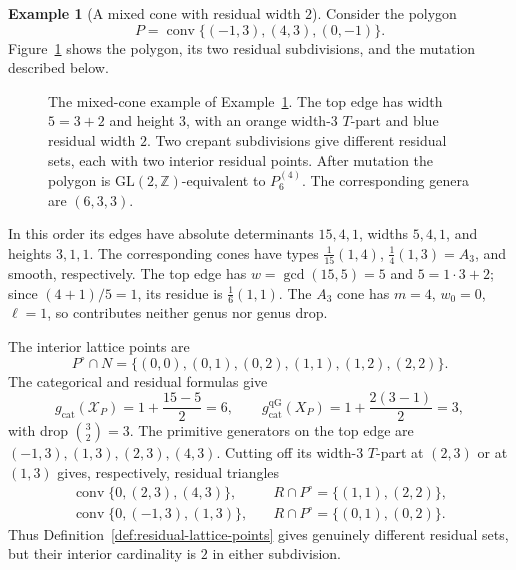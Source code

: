 \documentclass[11pt]{article}
\theoremstyle{plain}
\theoremstyle{definition}
\newtheorem{example}[theorem]{Example}
\theoremstyle{remark}
\newcommand{\Z}{\mathbb Z}
\newcommand{\1}{\mathbf 1}
\begin{document}
\begin{example}[A mixed cone with residual width $2$]\label{ex:mixed-cone-delta}
Consider the polygon
\[
\boxed{P=\operatorname{conv}\{(-1,3),(4,3),(0,-1)\}.}
\]
Figure~\ref{fig:mixed-cone-example} shows the polygon, its two residual subdivisions, and the mutation described below.

\begin{figure}[tp]
\centering

\caption{The mixed-cone example of Example~\ref{ex:mixed-cone-delta}.  The top edge has width $5=3+2$ and height $3$, with an orange width-$3$ $T$-part and blue residual width $2$.  Two crepant subdivisions give different residual sets, each with two interior residual points.  After mutation the polygon is $\mathrm{GL}(2,\Z)$-equivalent to $P_6^{(4)}$.  The corresponding genera are $(6,3,3)$.}
\label{fig:mixed-cone-example}
\end{figure}

In this order its edges have absolute determinants $15,4,1$, widths $5,4,1$, and heights $3,1,1$.  The corresponding cones have types $\frac1{15}(1,4)$, $\frac14(1,3)=A_3$, and smooth, respectively.  The top edge has $w=\gcd(15,5)=5$ and $5=1\cdot3+2$; since $(4+1)/5=1$, its residue is $\frac16(1,1)$.  The $A_3$ cone has $m=4$, $w_0=0$, $\ell=1$, so contributes neither genus nor genus drop.

The interior lattice points are
\[
P^\circ\cap N=\{(0,0),(0,1),(0,2),(1,1),(1,2),(2,2)\}.
\]
The categorical and residual formulas give
\[
g_{\mathrm{cat}}(\mathcal X_P)=1+\frac{15-5}{2}=6,
\qquad
g_{\mathrm{cat}}^{\mathrm{qG}}(X_P)=1+\frac{2(3-1)}2=3,
\]
with drop $\binom32=3$.  The primitive generators on the top edge are $(-1,3),(1,3),(2,3),(4,3)$.  Cutting off its width-$3$ $T$-part at $(2,3)$ or at $(1,3)$ gives, respectively, residual triangles
\[
\begin{aligned}
\operatorname{conv}\{0,(2,3),(4,3)\},&\quad R\cap P^\circ=\{(1,1),(2,2)\},\\
\operatorname{conv}\{0,(-1,3),(1,3)\},&\quad R\cap P^\circ=\{(0,1),(0,2)\}.
\end{aligned}
\]
Thus Definition~\ref{def:residual-lattice-points} gives genuinely different residual sets, but their interior cardinality is $2$ in either subdivision.


\end{example}
\end{document}
